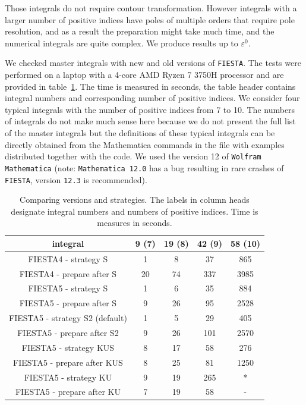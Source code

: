 \documentclass[preprint,12pt]{elsarticle}
\newcommand{\ep}{\varepsilon}
\begin{document}
Those integrals do not require contour transformation. However integrals with a larger number of positive indices have poles of multiple orders that require pole resolution, and as a result the preparation might take much time, and the numerical integrals are quite complex. We produce results up to $\ep^0$.

We checked master integrals with new and old versions of {\tt FIESTA}. The tests were performed on a laptop with a 4-core AMD Ryzen 7 3750H processor and are provided in table~\ref{versions_strategies}. The time is measured in seconds, the table header contains integral numbers and corresponding number of positive indices. 
We consider four typical integrals with the number of positive indices from 7 to 10. The numbers of integrals do not make much sense here because we do not present the full list of the master integrals but the definitions of these typical integrals can be directly 
obtained from the Mathematica commands in the file with examples distributed together with the code.
We used the version 12 of {\tt Wolfram Mathematica} (note: {\tt Mathematica 12.0} has a bug resulting in rare crashes of {\tt FIESTA}, version {\tt 12.3} is recommended).

\begin{table}[ht]
\begin{center}
\begin{tabular}{ |c|c|c|c|c| } 
 \hline
 integral                       & 9 (7) & 19 (8) & 42 (9) & 58 (10)\\ 
 \hline
 FIESTA4 - strategy S           &     1 &     8  &     37 &    865 \\ 
 FIESTA4 - prepare after S      &    20 &    74  &    337 &   3985 \\ 
 FIESTA5 - strategy S            &     1 &     6  &     35 &    884 \\ 
 FIESTA5 - prepare after S      &     9 &    26  &     95 &   2528 \\ 
 FIESTA5 - strategy S2 (default) &     1 &     5  &     29 &    405 \\ 
 FIESTA5 - prepare after S2     &     9 &    26  &    101 &   2570 \\ 
 FIESTA5 - strategy KUS          &     8 &    17  &     58 &    276 \\ 
 FIESTA5 - prepare after KUS    &     8 &    25  &     81 &   1250 \\
 FIESTA5 - strategy KU           &     9 &    19  &    265 &      * \\ 
 FIESTA5 - prepare after KU     &     7 &    19  &     58 &      - \\ 
 \hline
\end{tabular}
\end{center}
\caption{Comparing versions and strategies. The labels in column heads designate integral numbers and numbers of positive indices. Time is measures in seconds.\label{versions_strategies}}
\end{table}
\end{document}
